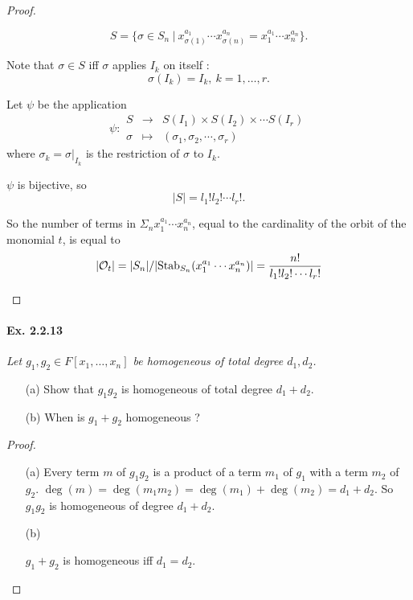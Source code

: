 \documentclass[11pt,a4paper]{article}
\begin{document}
\begin{proof}
\begin{enumerate}
$$S = \{ \sigma \in S_n \ \vert \  x_{\sigma(1)}^{a_1}\cdots x_{\sigma(n)}^{a_n}=x_{1}^{a_1}\cdots x_{n}^{a_n} \}.$$

Note that $\sigma \in S$ iff $\sigma$  applies $I_k$ on itself : $$\sigma(I_k) = I_k,\  k=1,\ldots,r.$$

Let $\psi$ be the application
$$\psi: 
\begin{array}{ccc}
S  & \to  &S(I_1) \times S(I_2)\times \cdots S(I_r)  \\
\sigma  &  \mapsto  &   (\sigma_1,\sigma_2, \cdots,\sigma_r)
\end{array}
$$
where  $\sigma_k = \sigma \vert_{I_k}$ is the restriction of $\sigma$ to $I_k$.

$\psi $ is bijective, so $$\vert S \vert = l_1!l_2!\cdots l_r!.$$

So the number of terms in  $\Sigma_n x_{1}^{a_1}\cdots x_{n}^{a_n}$, equal to the cardinality of the orbit of the monomial $t$, is equal to
$$\vert {\cal O}_t \vert = \vert S_n \vert /  \vert \mathrm{Stab}_{S_n}(x_{1}^{a_1}\cdots x_{n}^{a_n}) \vert = \frac{n!}{l_1!l_2!\cdots l_r!}$$

\end{enumerate}
\end{proof}

\paragraph{Ex. 2.2.13}

{\it Let $g_1,g_2 \in F[x_1,\ldots,x_n]$ be homogeneous of total degree $d_1,d_2$.
\begin{enumerate}
\item[(a)] Show that $g_1g_2$ is homogeneous of total degree $d_1+d_2$.
\item[(b)] When is $g_1+g_2$ homogeneous ?
\end{enumerate}
}

\begin{proof}
\begin{enumerate}
\item[(a)]
Every term $m$ of $g_1g_2$ is a product of a term $m_1$ of $g_1$ with a term $m_2$ of $g_2$.
$\deg(m) = \deg(m_1m_2) = \deg(m_1) + \deg(m_2) = d_1+d_2$.
So $g_1g_2$ is homogeneous of degree $d_1+d_2$.

\item[(b)]

$g_1+g_2$ is homogeneous iff $d_1=d_2$.
\end{enumerate}
\end{proof}
\end{document}
